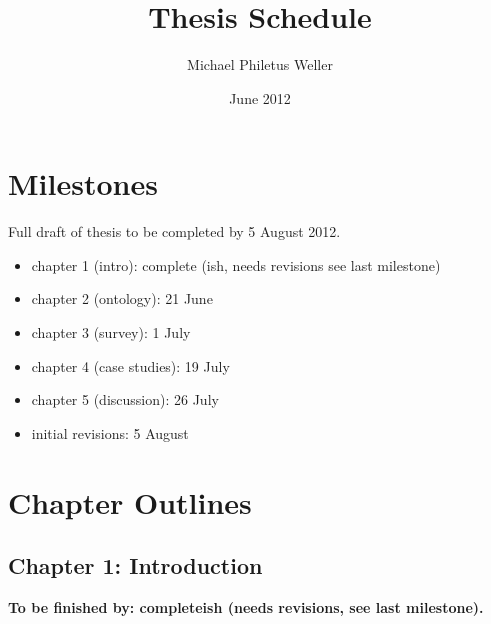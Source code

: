 \documentclass[12pt,letterpaper,notitlepage,onecolumn]{article}
\title{Thesis Schedule}
\author{Michael Philetus Weller}
\date{June 2012}
\begin{document}
\maketitle

\section{Milestones}
%
Full draft of thesis to be completed by 5 August 2012.

\begin{itemize}
    \item chapter 1 (intro): complete (ish, needs revisions see last milestone)
    \item chapter 2 (ontology): 21 June
    \item chapter 3 (survey): 1 July
    \item chapter 4 (case studies): 19 July
    \item chapter 5 (discussion): 26 July
    \item initial revisions: 5 August
\end{itemize}

\section{Chapter Outlines}

\subsection{Chapter 1: Introduction}
%
\textbf{To be finished by: completeish (needs revisions, see last milestone).}
\end{document}
